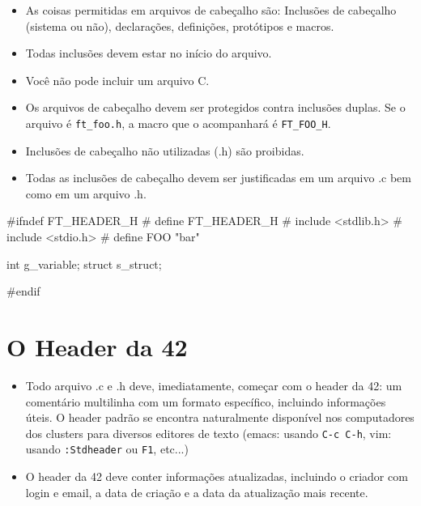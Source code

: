 \documentclass{42-pt}
\begin{document}
        \begin{itemize}

            \item As coisas permitidas em arquivos de cabeçalho são:
                Inclusões de cabeçalho (sistema ou não), declarações, definições,
                protótipos e macros.

            \item Todas inclusões devem estar no início do arquivo.

            \item Você não pode incluir um arquivo C.

            \item Os arquivos de cabeçalho devem ser protegidos contra inclusões
             duplas. Se o arquivo é \texttt{ft\_foo.h}, a macro que o acompanhará
             é \texttt{FT\_FOO\_H}.

            \item Inclusões de cabeçalho não utilizadas (.h) são proibidas.

            \item Todas as inclusões de cabeçalho devem ser justificadas em um arquivo .c
                bem como em um arquivo .h.

        \end{itemize}

        \begin{42ccode}
#ifndef FT_HEADER_H
# define FT_HEADER_H
# include <stdlib.h>
# include <stdio.h>
# define FOO "bar"

int g_variable;
struct s_struct;

#endif
        \end{42ccode}
        \newpage


   \section{O Header da 42}

        \begin{itemize}

        \item Todo arquivo .c e .h deve, imediatamente, começar com o header da 42:
          um comentário multilinha com um formato específico, incluindo informações
          úteis. O header padrão se encontra naturalmente disponível nos computadores
          dos clusters para diversos editores de texto (emacs: usando \texttt{C-c C-h},
          vim: usando \texttt{:Stdheader} ou \texttt{F1}, etc...)

        \item O header da 42 deve conter informações atualizadas, incluindo o
          criador com login e email, a data de criação e a data da atualização
          mais recente.

        \end{itemize}
        \newpage
        
\end{document}
